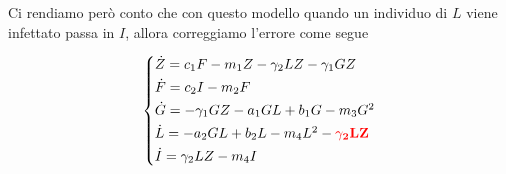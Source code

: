 \documentclass[12pt,a4paper]{article}
\numberwithin{theorem}{section}
\numberwithin{definition}{section}
\numberwithin{example}{section}
\newcommand{\deftitle}[1]{{\color{red}\bf{#1}\color{black}}}
\begin{document}
%
%
%
%

\bigskip

Ci rendiamo però conto che con questo modello quando un individuo di $L$ viene infettato passa in $I$, allora correggiamo l'errore come segue

$$\begin{cases*}
	\dot Z= c_1F-m_1 Z -\gamma_2LZ-\gamma_1GZ \\
	\dot F= c_2I - m_2 F \\
  \dot G= -\gamma_1  GZ - a_1GL +b_1 G - m_3 G^2 \\
	\dot L=  -a_2 GL+b_2 L - m_4{L^2}-\deftitle{\gamma_2 LZ} \\ %
	\dot I=\gamma_2 LZ-m_4 I \\	
\end{cases*}$$
\end{document}
